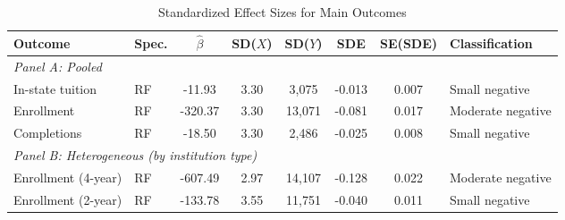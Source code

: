 \begin{table}[H]
\centering
\caption{Standardized Effect Sizes for Main Outcomes}
\label{tab:sde}
\begin{adjustbox}{max width=\textwidth}
\begin{tabular}{llcccccl}
\toprule
Outcome & Spec. & $\hat{\beta}$ & SD($X$) & SD($Y$) & SDE & SE(SDE) & Classification \\
\midrule
\multicolumn{8}{l}{\textit{Panel A: Pooled}} \\
In-state tuition & RF & -11.93 & 3.30 & 3,075 & -0.013 & 0.007 & Small negative \\
Enrollment & RF & -320.37 & 3.30 & 13,071 & -0.081 & 0.017 & Moderate negative \\
Completions & RF & -18.50 & 3.30 & 2,486 & -0.025 & 0.008 & Small negative \\
\midrule
\multicolumn{8}{l}{\textit{Panel B: Heterogeneous (by institution type)}} \\
Enrollment (4-year) & RF & -607.49 & 2.97 & 14,107 & -0.128 & 0.022 & Moderate negative \\
Enrollment (2-year) & RF & -133.78 & 3.55 & 11,751 & -0.040 & 0.011 & Small negative \\
\bottomrule
\end{tabular}
\end{adjustbox}
\par\vspace{0.3em}
\begin{minipage}{\textwidth}
{\footnotesize
}
\end{minipage}
\end{table}
